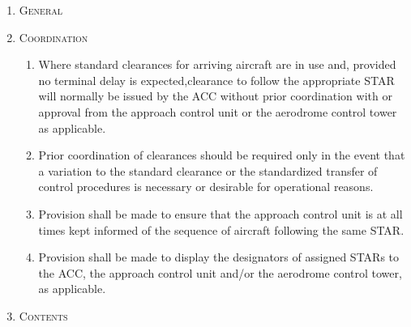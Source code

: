 \documentclass[../main.tex]{subfiles}
\begin{document}
    \begin{enumerate}[itemsep=0.2cm]\centering
        \item \textsc{General}

        \item \textsc{Coordination}
        \begin{enumerate}
            \item Where standard clearances for arriving aircraft are in use and, provided no terminal delay is expected,clearance to follow the appropriate STAR will normally be issued by the ACC without prior coordination with or approval from the approach control unit or the aerodrome control tower as applicable.
            \item Prior coordination of clearances should be required only in the event that a variation to the standard clearance or the standardized transfer of control procedures is necessary or desirable for operational reasons.
            \item Provision shall be made to ensure that the approach control unit is at all times kept informed of the sequence of aircraft following the same STAR.
            \item Provision shall be made to display the designators of assigned STARs to the ACC, the approach control unit and/or the aerodrome control tower, as applicable.
        \end{enumerate}

        \item \textsc{Contents}
\end{enumerate}
\end{document}
